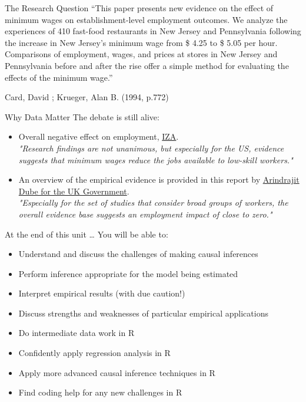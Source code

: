 \documentclass[
  ignorenonframetext,
]{beamer}
\begin{document}
\begin{frame}{The Research Question}
\label{the-research-question}
``This paper presents new evidence on the effect of minimum wages on
establishment-level employment outcomes. We analyze the experiences of
410 fast-food restaurants in New Jersey and Pennsylvania following the
increase in New Jersey's minimum wage from \$ 4.25 to \$ 5.05 per hour.
Comparisons of employment, wages, and prices at stores in New Jersey and
Pennsylvania before and after the rise offer a simple method for
evaluating the effects of the minimum wage.''

Card, David ; Krueger, Alan B. (1994, p.772)
\end{frame}

\begin{frame}{Why Data Matter}
\label{why-data-matter}
The debate is still alive:

\begin{itemize}
  \item Overall negative effect on employment, \href{https://wol.iza.org/articles/employment-effects-of-minimum-wages}{IZA}.\\
  \emph{"Research findings are not unanimous, but especially for the US, evidence suggests that minimum wages reduce the jobs available to low-skill workers."}
  \item An overview of the empirical evidence is provided in this report by \href{https://assets.publishing.service.gov.uk/government/uploads/system/uploads/attachment_data/file/844350/impacts_of_minimum_wages_review_of_the_international_evidence_Arindrajit_Dube_web.pdf}{Arindrajit Dube for the UK Government}. \\
  \emph{"Especially for the set of studies that consider broad groups of workers, the overall evidence base suggests an employment impact of close to zero."}
\end{itemize}
\end{frame}

\begin{frame}{At the end of this unit \ldots{}}
\label{at-the-end-of-this-unit}
You will be able to:

\begin{itemize}
  \item Understand and discuss the challenges of making causal inferences
  \item Perform inference appropriate for the model being estimated
  \item Interpret empirical results (with due caution!)
  \item Discuss strengths and weaknesses of particular empirical applications
  \item Do intermediate data work in R
  \item Confidently apply regression analysis in R
  \item Apply more advanced causal inference techniques in R
  \item Find coding help for any new challenges in R

\end{itemize}
\end{frame}
\end{document}
